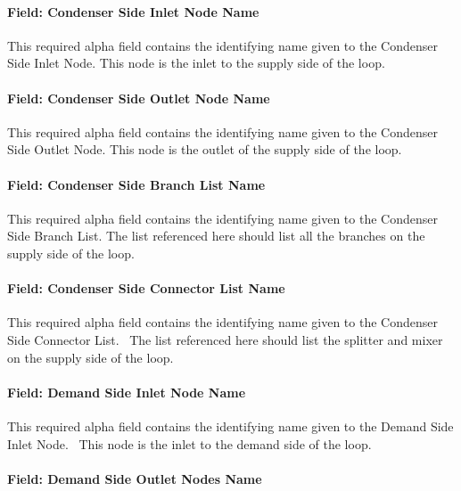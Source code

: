 \paragraph{Field: Condenser Side Inlet Node Name}\label{field-condenser-side-inlet-node-name}

This required alpha field contains the identifying name given to the Condenser Side Inlet Node. This node is the inlet to the supply side of the loop.

\paragraph{Field: Condenser Side Outlet Node Name}\label{field-condenser-side-outlet-node-name}

This required alpha field contains the identifying name given to the Condenser Side Outlet Node. This node is the outlet of the supply side of the loop.

\paragraph{Field: Condenser Side Branch List Name}\label{field-condenser-side-branch-list-name}

This required alpha field contains the identifying name given to the Condenser Side Branch List. The list referenced here should list all the branches on the supply side of the loop.

\paragraph{Field: Condenser Side Connector List Name}\label{field-condenser-side-connector-list-name}

This required alpha field contains the identifying name given to the Condenser Side Connector List.~ The list referenced here should list the splitter and mixer on the supply side of the loop.

\paragraph{Field: Demand Side Inlet Node Name}\label{field-demand-side-inlet-node-name-1}

This required alpha field contains the identifying name given to the Demand Side Inlet Node.~ This node is the inlet to the demand side of the loop.

\paragraph{Field: Demand Side Outlet Nodes Name}\label{field-demand-side-outlet-nodes-name}

